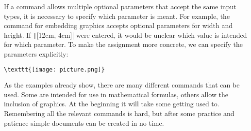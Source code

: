 \begin{table}[h!]
	\caption{Examples for \LaTeX-commands}
	\label{tbl:latex-commands}
\end{table}

If a command allows multiple optional parameters that accept the same input types, it is necessary to specify which parameter is meant. For example, the command for embedding graphics accepts optional parameters for width and height. If \texttt|[12cm, 4cm]| were entered, it would be unclear which value is intended for which parameter. To make the assignment more concrete, we can specify the parameters explicitly:
\begin{verbatim}
\texttt{[image: picture.png]}
\end{verbatim}

As the examples already show, there are many different commands that can be used. Some are intended for use in mathematical formulas, others allow the inclusion of graphics. At the beginning it will take some getting used to. Remembering all the relevant commands is hard, but after some practice and patience simple documents can be created in no time.